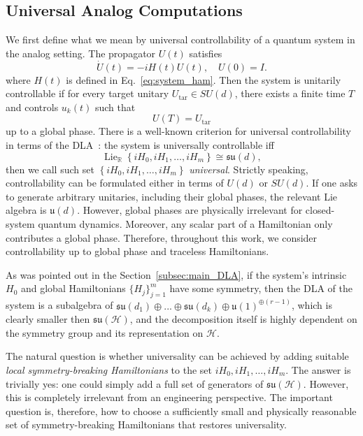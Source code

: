 \documentclass[10pt,twocolumn,superscriptaddress,aps,amsmath,amssymb,citeautoscript,floatfix,prx,longbibliography]{revtex4-2}
\newcounter{alg}
\theoremstyle{plain}
\theoremstyle{plain}
\theoremstyle{plain}
\theoremstyle{plain}
\theoremstyle{plain}
\theoremstyle{plain}
\begin{document}
\subsection{Universal Analog Computations}\label{subsec:main_univ_analog}

We first define what we mean by universal controllability of a quantum system in the analog setting.
The propagator $U(t)$ satisfies
$$
\dot{U}(t)=-i H(t) U(t), \quad U(0)=I .
$$
where $H(t)$ is defined in Eq.~\eqref{eq:system_ham}. Then the system is unitarily controllable if for every target unitary $U_{\text {tar}} \in SU(d)$, there exists a finite time $T$ and controls $u_k(t)$ such that
$$
    U(T)=U_{\operatorname{tar}}
$$
up to a global phase.
There is a well-known criterion for universal controllability in terms of the DLA~\cite{Albertini2003}: the system is universally controllable iff 
    $$
    \operatorname{Lie}_{\mathbb{R}}\left\{i H_0, i H_1, \ldots, i H_m\right\}\cong
    \mathfrak{su}(d),
    $$
then we call such set $\left\{i H_0, i H_1, \ldots, i H_m\right\}$ \textit{universal}. Strictly speaking, controllability can be formulated either in terms of \(U(d)\) or \(SU(d)\). If one asks to generate arbitrary unitaries, including their global phases, the relevant Lie algebra is \(\mathfrak{u}(d)\). However, global phases are physically irrelevant for closed-system quantum dynamics. Moreover, any scalar part of a Hamiltonian only contributes a global phase.
Therefore, throughout this work, we consider controllability up to global phase and traceless Hamiltonians.

As was pointed out in the Section~\ref{subsec:main_DLA}, if the system's intrinsic $H_0$ and global Hamiltonians $\{H_j\}_{j=1}^m$ have some symmetry, then the DLA of the system is a subalgebra
of $\mathfrak{su}(d_1)\oplus...\oplus\mathfrak{su}(d_k)\oplus \mathfrak{u}(1)^{\oplus(r-1)}$, which is clearly smaller then $\mathfrak{su}(\mathcal{H})$,
and the decomposition itself is highly dependent on the symmetry group and its representation on $\mathcal{H}$. 

The natural question is whether universality can be achieved by adding suitable \textit{local symmetry-breaking Hamiltonians} to the set
$
{iH_0,iH_1,\ldots,iH_m}.
$
The answer is trivially yes: one could simply add a full set of generators of \(\mathfrak{su}(\mathcal H)\). However, this is completely irrelevant from an engineering perspective. The important question is, therefore, how to choose a sufficiently small and physically reasonable set of symmetry-breaking Hamiltonians that restores universality.
\end{document}
